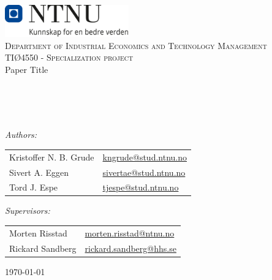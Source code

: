 \begin{titlepage}

\vbox{ }

\vbox{ }

\begin{center}
\includegraphics[width=0.40\textwidth]{Images/NTNU_logo.png}\\[1cm]
\textsc{\Large Department of Industrial Economics and Technology Management}\\[1cm]

\textsc{\Large TIØ4550 - Specialization project}\\[0.5cm]


\def\checktitle{Paper Title}
\ifx\TITLE\checktitle
\fi

\vbox{ }
\HRule \\[0.4cm]
{ \huge \bfseries \TITLE }\\[0.4cm]
\HRule \\[1.5cm]
\large


\emph{Authors:}\\
\begin{center}
\begin{tabular}{>{\raggedright}p{4.1cm} p{4.1cm}}  
    Kristoffer N. B. Grude & \href{mailto:kngrude@stud.ntnu.no}{kngrude@stud.ntnu.no} \\
    Sivert A. Eggen & \href{mailto:sivertae@stud.ntnu.no}{sivertae@stud.ntnu.no} \\
    Tord J. Espe & \href{mailto:tjespe@stud.ntnu.no}{tjespe@stud.ntnu.no} \\
\end{tabular}
\end{center}

\emph{Supervisors:}\\
\begin{center}
\small  %
\begin{tabular}{>{\raggedright}p{4cm} p{4cm}}  
    Morten Risstad & \href{mailto:morten.risstad@ntnu.no}{morten.risstad@ntnu.no} \\
    Rickard Sandberg & \href{mailto:rickard.sandberg@hhs.se}{rickard.sandberg@hhs.se} \\
\end{tabular}
\end{center}


\vfill
{\large \today}
\end{center}
\end{titlepage}








